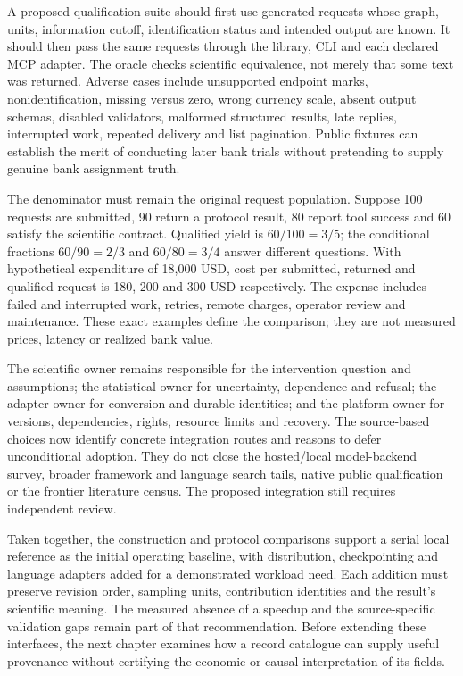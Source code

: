 A proposed qualification suite should first use generated requests whose
graph, units, information cutoff, identification status and intended output
are known. It should then pass the same requests through the library, CLI
and each declared MCP adapter. The oracle checks scientific equivalence,
not merely that some text was returned. Adverse cases include unsupported
endpoint marks, nonidentification, missing versus zero, wrong currency scale,
absent output schemas, disabled validators, malformed structured results,
late replies, interrupted work, repeated delivery and list pagination.
Public fixtures can establish the merit of conducting later bank trials
without pretending to supply genuine bank assignment truth.
\citep{exec24_mcp_contracts}

The denominator must remain the original request population. Suppose 100
requests are submitted, 90 return a protocol result, 80 report tool success
and 60 satisfy the scientific contract. Qualified yield is $60/100=3/5$;
the conditional fractions $60/90=2/3$ and $60/80=3/4$ answer different
questions. With hypothetical expenditure of 18,000 USD, cost per submitted,
returned and qualified request is 180, 200 and 300 USD respectively. The
expense includes failed and interrupted work, retries, remote charges,
operator review and maintenance. These exact examples define the comparison;
they are not measured prices, latency or realized bank value.
\citep{exec24_mcp_contracts}

The scientific owner remains responsible for the intervention question and
assumptions; the statistical owner for uncertainty, dependence and refusal;
the adapter owner for conversion and durable identities; and the platform
owner for versions, dependencies, rights, resource limits and recovery.
The source-based choices now identify concrete integration routes and
reasons to defer unconditional adoption. They do not close the hosted/local
model-backend survey, broader framework and language search tails, native
public qualification or the frontier literature census. The proposed integration still requires independent review.
\citep{exec24_mcp_contracts}

Taken together, the construction and protocol comparisons support a serial local reference as the initial operating baseline, with distribution, checkpointing and language adapters added for a demonstrated workload need. Each addition must preserve revision order, sampling units, contribution identities and the result's scientific meaning. The measured absence of a speedup and the source-specific validation gaps remain part of that recommendation. Before extending these interfaces, the next chapter examines how a record catalogue can supply useful provenance without certifying the economic or causal interpretation of its fields.
